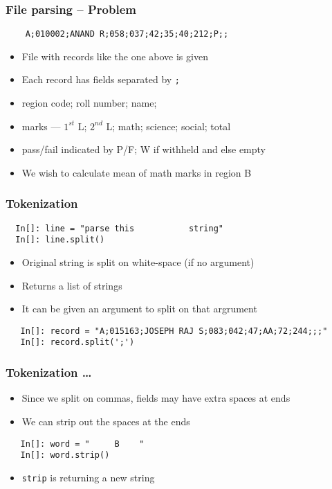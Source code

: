 \begin{frame}[fragile]
  \frametitle{File parsing -- Problem}
  \begin{lstlisting}
    A;010002;ANAND R;058;037;42;35;40;212;P;;
  \end{lstlisting}
  \begin{itemize}
  \item File with records like the one above is given
  \item Each record has fields separated by \verb+;+
  \item region code; roll number; name; 
  \item marks --- $1^{st}$ L; $2^{nd}$ L; math; science; social; total
  \item pass/fail indicated by P/F; W if withheld and else empty
    \end{itemize}

  \begin{itemize}
  \item We wish to calculate mean of math marks in region B
  \end{itemize}
\end{frame}

\begin{frame}[fragile]
  \frametitle{Tokenization}
  \begin{lstlisting}
  In[]: line = "parse this           string"
  In[]: line.split()
  \end{lstlisting}
  \begin{itemize}
  \item Original string is split on white-space (if no argument)
  \item Returns a list of strings
  \item It can be given an argument to split on that argrument
  \end{itemize}
  \begin{lstlisting}
   In[]: record = "A;015163;JOSEPH RAJ S;083;042;47;AA;72;244;;;"
   In[]: record.split(';')
  \end{lstlisting}
\end{frame}

\begin{frame}[fragile]
  \frametitle{Tokenization \ldots}
  \begin{itemize}
  \item Since we split on commas, fields may have extra spaces at ends
  \item We can strip out the spaces at the ends
  \end{itemize}
  \begin{lstlisting}
   In[]: word = "     B    "
   In[]: word.strip()
  \end{lstlisting}
  \begin{itemize}
  \item \texttt{strip} is returning a new string 
  \end{itemize}
\end{frame}


